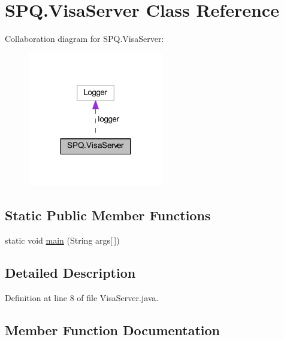 \hypertarget{class_s_p_q_1_1_visa_server}{}\section{S\+P\+Q.\+Visa\+Server Class Reference}
\label{class_s_p_q_1_1_visa_server}


Collaboration diagram for S\+P\+Q.\+Visa\+Server\+:\nopagebreak
\begin{figure}[H]
\begin{center}
\leavevmode
\includegraphics[width=167pt]{class_s_p_q_1_1_visa_server__coll__graph}
\end{center}
\end{figure}
\subsection*{Static Public Member Functions}
\begin{DoxyCompactItemize}
\item 
static void \mbox{\hyperlink{class_s_p_q_1_1_visa_server_adb71a2f4fb93f80faae22d928a2a5229}{main}} (String args\mbox{[}$\,$\mbox{]})
\end{DoxyCompactItemize}


\subsection{Detailed Description}


Definition at line 8 of file Visa\+Server.\+java.



\subsection{Member Function Documentation}
\mbox{\label{class_s_p_q_1_1_visa_server_adb71a2f4fb93f80faae22d928a2a5229}} 

